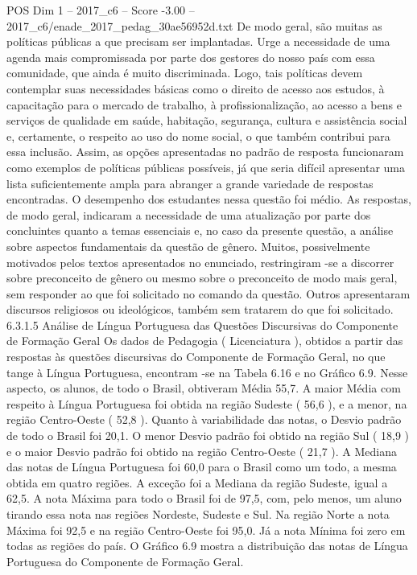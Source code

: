 \begin{textsample}{POS Dim 1 – 2017\_c6 – Score -3.00 – 2017\_c6/enade\_2017\_pedag\_30ae56952d.txt}
De modo geral, são muitas as políticas públicas a que precisam ser implantadas.
Urge a necessidade de uma agenda mais compromissada por parte dos gestores do nosso país com essa comunidade, que ainda é muito discriminada.
Logo, tais políticas devem contemplar suas necessidades básicas como o direito de acesso aos estudos, à capacitação para o mercado de trabalho, à profissionalização, ao acesso a bens e serviços de qualidade em saúde, habitação, segurança, cultura e assistência social e, certamente, o respeito ao uso do nome social, o que também contribui para essa inclusão.
Assim, as opções apresentadas no padrão de resposta funcionaram como exemplos de políticas públicas possíveis, já que seria difícil apresentar uma lista suficientemente ampla para abranger a grande variedade de respostas encontradas.
O desempenho dos estudantes nessa questão foi médio.
As respostas, de modo geral, indicaram a necessidade de uma atualização por parte dos concluintes quanto a temas essenciais e, no caso da presente questão, a análise sobre aspectos fundamentais da questão de gênero.
Muitos, possivelmente motivados pelos textos apresentados no enunciado, restringiram -se a discorrer sobre preconceito de gênero ou mesmo sobre o preconceito de modo mais geral, sem responder ao que foi solicitado no comando da questão.
Outros apresentaram discursos religiosos ou ideológicos, também sem tratarem do que foi solicitado. 6.3.1.5 Análise de Língua Portuguesa das Questões Discursivas do Componente de Formação Geral Os dados de Pedagogia ( Licenciatura ), obtidos a partir das respostas às questões discursivas do Componente de Formação Geral, no que tange à Língua Portuguesa, encontram -se na Tabela 6.16 e no Gráfico 6.9.
Nesse aspecto, os alunos, de todo o Brasil, obtiveram Média 55,7.
A maior Média com respeito à Língua Portuguesa foi obtida na região Sudeste ( 56,6 ), e a menor, na região Centro-Oeste ( 52,8 ).
Quanto à variabilidade das notas, o Desvio padrão de todo o Brasil foi 20,1.
O menor Desvio padrão foi obtido na região Sul ( 18,9 ) e o maior Desvio padrão foi obtido na região Centro-Oeste ( 21,7 ).
A Mediana das notas de Língua Portuguesa foi 60,0 para o Brasil como um todo, a mesma obtida em quatro regiões.
A exceção foi a Mediana da região Sudeste, igual a 62,5.
A nota Máxima para todo o Brasil foi de 97,5, com, pelo menos, um aluno tirando essa nota nas regiões Nordeste, Sudeste e Sul.
Na região Norte a nota Máxima foi 92,5 e na região Centro-Oeste foi 95,0.
Já a nota Mínima foi zero em todas as regiões do país.
O Gráfico 6.9 mostra a distribuição das notas de Língua Portuguesa do Componente de Formação Geral.

\end{textsample}
